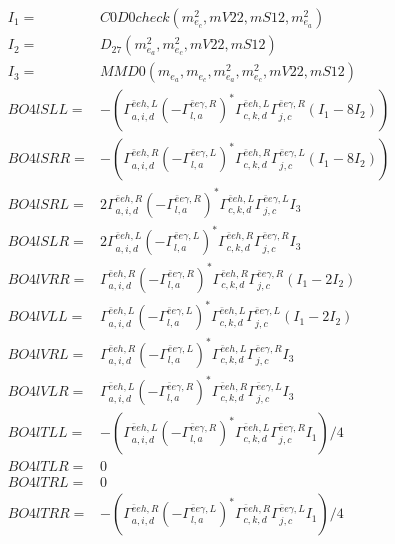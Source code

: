 \documentclass[A4,landscape]{article}
\begin{document}
\begin{align} 
I_1 = & C0D0check(m^2_{e_{{c}}}, mV22, mS12, m^2_{e_{{a}}}) \\ 
I_2 = & D_{27}(m^2_{e_{{a}}}, m^2_{e_{{c}}}, mV22, mS12) \\ 
I_3 = & MMD0(m_{e_{{a}}}, m_{e_{{c}}}, m^2_{e_{{a}}}, m^2_{e_{{c}}}, mV22, mS12) \\ 
  BO4lSLL= & -( \Gamma^{\bar{e}e h ,L}_{a, i, d} (- \Gamma^{\bar{e}e \gamma ,R} _{l, a})^* \Gamma^{\bar{e}e h ,L}_{c, k, d} \Gamma^{\bar{e}e \gamma ,R}_{j, c} (I_1 - 8 I_2)) \\ 
  BO4lSRR= & -( \Gamma^{\bar{e}e h ,R}_{a, i, d} (- \Gamma^{\bar{e}e \gamma ,L} _{l, a})^* \Gamma^{\bar{e}e h ,R}_{c, k, d} \Gamma^{\bar{e}e \gamma ,L}_{j, c} (I_1 - 8 I_2)) \\ 
  BO4lSRL= & 2  \Gamma^{\bar{e}e h ,R}_{a, i, d} (- \Gamma^{\bar{e}e \gamma ,R} _{l, a})^* \Gamma^{\bar{e}e h ,L}_{c, k, d} \Gamma^{\bar{e}e \gamma ,L}_{j, c} I_3 \\ 
  BO4lSLR= & 2  \Gamma^{\bar{e}e h ,L}_{a, i, d} (- \Gamma^{\bar{e}e \gamma ,L} _{l, a})^* \Gamma^{\bar{e}e h ,R}_{c, k, d} \Gamma^{\bar{e}e \gamma ,R}_{j, c} I_3 \\ 
  BO4lVRR= &  \Gamma^{\bar{e}e h ,R}_{a, i, d} (- \Gamma^{\bar{e}e \gamma ,R} _{l, a})^* \Gamma^{\bar{e}e h ,R}_{c, k, d} \Gamma^{\bar{e}e \gamma ,R}_{j, c} (I_1 - 2 I_2) \\ 
  BO4lVLL= &  \Gamma^{\bar{e}e h ,L}_{a, i, d} (- \Gamma^{\bar{e}e \gamma ,L} _{l, a})^* \Gamma^{\bar{e}e h ,L}_{c, k, d} \Gamma^{\bar{e}e \gamma ,L}_{j, c} (I_1 - 2 I_2) \\ 
  BO4lVRL= &  \Gamma^{\bar{e}e h ,R}_{a, i, d} (- \Gamma^{\bar{e}e \gamma ,L} _{l, a})^* \Gamma^{\bar{e}e h ,L}_{c, k, d} \Gamma^{\bar{e}e \gamma ,R}_{j, c} I_3 \\ 
  BO4lVLR= &  \Gamma^{\bar{e}e h ,L}_{a, i, d} (- \Gamma^{\bar{e}e \gamma ,R} _{l, a})^* \Gamma^{\bar{e}e h ,R}_{c, k, d} \Gamma^{\bar{e}e \gamma ,L}_{j, c} I_3 \\ 
  BO4lTLL= & -( \Gamma^{\bar{e}e h ,L}_{a, i, d} (- \Gamma^{\bar{e}e \gamma ,R} _{l, a})^* \Gamma^{\bar{e}e h ,L}_{c, k, d} \Gamma^{\bar{e}e \gamma ,R}_{j, c} I_1)/4 \\ 
  BO4lTLR= & 0 \\ 
  BO4lTRL= & 0 \\ 
  BO4lTRR= & -( \Gamma^{\bar{e}e h ,R}_{a, i, d} (- \Gamma^{\bar{e}e \gamma ,L} _{l, a})^* \Gamma^{\bar{e}e h ,R}_{c, k, d} \Gamma^{\bar{e}e \gamma ,L}_{j, c} I_1)/4 \\ 
\end{align} 
\end{document}
